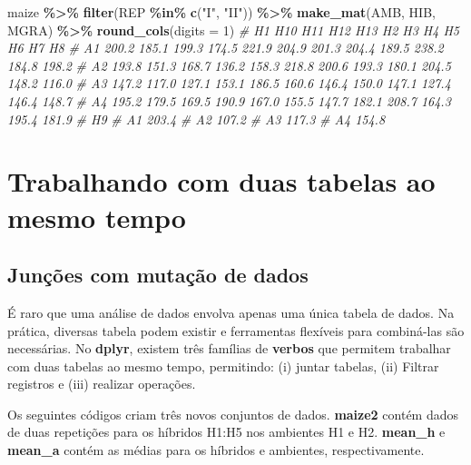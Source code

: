 \documentclass[
]{book}
\makeatletter
\newenvironment{Shaded}{\begin{snugshade}}{\end{snugshade}}
\newcommand{\CommentTok}[1]{\textcolor[rgb]{0.56,0.35,0.01}{\textit{#1}}}
\newcommand{\DataTypeTok}[1]{\textcolor[rgb]{0.13,0.29,0.53}{#1}}
\newcommand{\DecValTok}[1]{\textcolor[rgb]{0.00,0.00,0.81}{#1}}
\newcommand{\KeywordTok}[1]{\textcolor[rgb]{0.13,0.29,0.53}{\textbf{#1}}}
\newcommand{\NormalTok}[1]{#1}
\newcommand{\OperatorTok}[1]{\textcolor[rgb]{0.81,0.36,0.00}{\textbf{#1}}}
\newcommand{\StringTok}[1]{\textcolor[rgb]{0.31,0.60,0.02}{#1}}
\numberwithin{equation}{section}
\newcommand{\indf}[1]{\index[function]{#1@\texttt{#1()}|ST}}
\makeatother
\begin{document}
\begin{Shaded}
\begin{Highlighting}[]
\NormalTok{maize }\OperatorTok{\%\textgreater{}\%}
\StringTok{  }\KeywordTok{filter}\NormalTok{(REP }\OperatorTok{\%in\%}\StringTok{ }\KeywordTok{c}\NormalTok{(}\StringTok{"I"}\NormalTok{, }\StringTok{"II"}\NormalTok{)) }\OperatorTok{\%\textgreater{}\%}
\StringTok{  }\KeywordTok{make\_mat}\NormalTok{(AMB, HIB, MGRA) }\OperatorTok{\%\textgreater{}\%}\StringTok{ }
\StringTok{  }\KeywordTok{round\_cols}\NormalTok{(}\DataTypeTok{digits =} \DecValTok{1}\NormalTok{)}
\CommentTok{\#       H1   H10   H11   H12   H13    H2    H3    H4    H5    H6    H7    H8}
\CommentTok{\# A1 200.2 185.1 199.3 174.5 221.9 204.9 201.3 204.4 189.5 238.2 184.8 198.2}
\CommentTok{\# A2 193.8 151.3 168.7 136.2 158.3 218.8 200.6 193.3 180.1 204.5 148.2 116.0}
\CommentTok{\# A3 147.2 117.0 127.1 153.1 186.5 160.6 146.4 150.0 147.1 127.4 146.4 148.7}
\CommentTok{\# A4 195.2 179.5 169.5 190.9 167.0 155.5 147.7 182.1 208.7 164.3 195.4 181.9}
\CommentTok{\#       H9}
\CommentTok{\# A1 203.4}
\CommentTok{\# A2 107.2}
\CommentTok{\# A3 117.3}
\CommentTok{\# A4 154.8}
\end{Highlighting}
\end{Shaded}

\hypertarget{trabalhando-com-duas-tabelas-ao-mesmo-tempo}{%
\section{Trabalhando com duas tabelas ao mesmo tempo}\label{trabalhando-com-duas-tabelas-ao-mesmo-tempo}}

\hypertarget{junuxe7uxf5es-com-mutauxe7uxe3o-de-dados}{%
\subsection{Junções com mutação de dados}\label{junuxe7uxf5es-com-mutauxe7uxe3o-de-dados}}

É raro que uma análise de dados envolva apenas uma única tabela de dados. Na prática, diversas tabela podem existir e ferramentas flexíveis para combiná-las são necessárias. No \textbf{dplyr}, existem três famílias de \textbf{verbos} que permitem trabalhar com duas tabelas ao mesmo tempo, permitindo: (i) juntar tabelas, (ii) Filtrar registros e (iii) realizar operações.

Os seguintes códigos criam três novos conjuntos de dados. \textbf{maize2} contém dados de duas repetições para os híbridos H1:H5 nos ambientes H1 e H2. \textbf{mean\_h} e \textbf{mean\_a} contém as médias para os híbridos e ambientes, respectivamente. \indf{ungroup}
\end{document}

